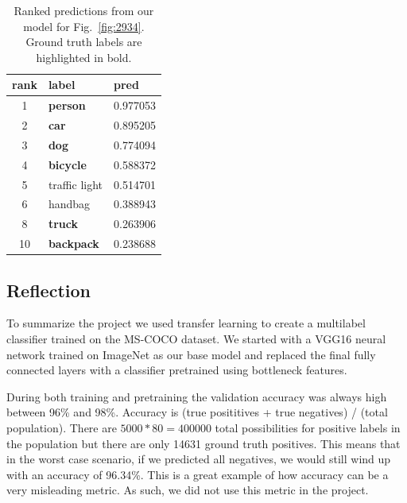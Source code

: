 \documentclass[12pt,journal,compsoc]{IEEEtran}
\begin{document}
\begin{table}
\caption{Ranked predictions from our model for Fig.~\ref{fig:2934}. Ground truth labels are highlighted in bold.}
\label{tab:2934}
\centering
\begin{tabular}{cll}
\toprule
rank &           label & pred \\
\midrule
1  &   \textbf{person} & 0.977053 \\
2  &      \textbf{car} & 0.895205 \\
3  &      \textbf{dog} & 0.774094 \\
4  &  \textbf{bicycle} & 0.588372 \\
5  &     traffic light & 0.514701 \\
6  &           handbag & 0.388943 \\
8  &    \textbf{truck} & 0.263906 \\
10 & \textbf{backpack} & 0.238688 \\
\bottomrule
\end{tabular}
\end{table}

\subsection{Reflection}


To summarize the project we used transfer learning to create a multilabel classifier trained on the MS-COCO dataset.  We started with a VGG16 neural network trained on ImageNet as our base model and replaced the final fully connected layers with a classifier pretrained using bottleneck features.  


During both training and pretraining the validation accuracy was always high between 96\% and 98\%. Accuracy is (true posititives + true negatives) / (total population).  There are $5000*80=400000$ total possibilities for positive labels in the population but there are only 14631 ground truth positives.  This means that in the worst case scenario, if we predicted all negatives, we would still wind up with an accuracy of 96.34\%. This is a great example of how accuracy can be a very misleading metric. As such, we did not use this metric in the project.
\end{document}
